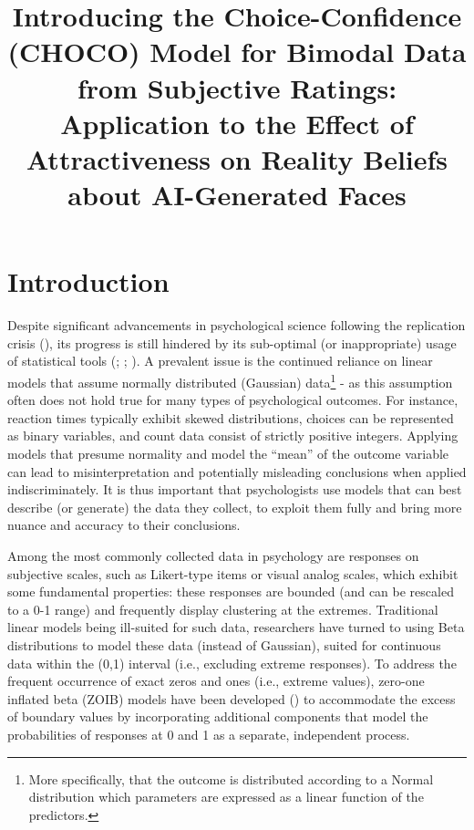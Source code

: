 \documentclass[
  jou,
  floatsintext,
  longtable,
  nolmodern,
  notxfonts,
  notimes,
  colorlinks=true,linkcolor=blue,citecolor=blue,urlcolor=blue]{apa7}
\title{\textbf{Introducing the Choice-Confidence (CHOCO) Model for
Bimodal Data from Subjective Ratings: Application to the Effect of
Attractiveness on Reality Beliefs about AI-Generated Faces}}
\begin{document}
\maketitle



\setcounter{secnumdepth}{-\maxdimen} %

\setlength\LTleft{0pt}

\resetlinenumber[1]



\section{Introduction}\label{introduction}

Despite significant advancements in psychological science following the
replication crisis (), its progress is still hindered by its sub-optimal (or
inappropriate) usage of statistical tools
(;
;
). A prevalent
issue is the continued reliance on linear models that assume normally
distributed (Gaussian) data\footnote{More specifically, that the outcome
  is distributed according to a Normal distribution which parameters are
  expressed as a linear function of the predictors.} - as this
assumption often does not hold true for many types of psychological
outcomes. For instance, reaction times typically exhibit skewed
distributions, choices can be represented as binary variables, and count
data consist of strictly positive integers. Applying models that presume
normality and model the ``mean'' of the outcome variable can lead to
misinterpretation and potentially misleading conclusions when applied
indiscriminately. It is thus important that psychologists use models
that can best describe (or generate) the data they collect, to exploit
them fully and bring more nuance and accuracy to their conclusions.

Among the most commonly collected data in psychology are responses on
subjective scales, such as Likert-type items or visual analog scales,
which exhibit some fundamental properties: these responses are bounded
(and can be rescaled to a 0-1 range) and frequently display clustering
at the extremes. Traditional linear models being ill-suited for such
data, researchers have turned to using Beta distributions to model these
data (instead of Gaussian), suited for continuous data within the (0,1)
interval (i.e., excluding extreme responses). To address the frequent
occurrence of exact zeros and ones (i.e., extreme values), zero-one
inflated beta (ZOIB) models have been developed
() to
accommodate the excess of boundary values by incorporating additional
components that model the probabilities of responses at 0 and 1 as a
separate, independent process.
\end{document}
